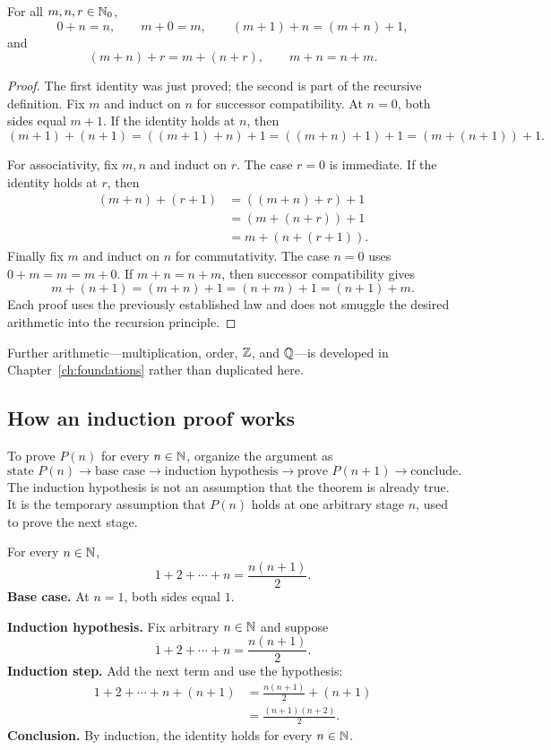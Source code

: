 \begin{proposition}
For all $m,n,r\in\mathbb{N}_0$,
\[
0+n=n,
\qquad
m+0=m,
\qquad
(m+1)+n=(m+n)+1,
\]
and
\[
(m+n)+r=m+(n+r),
\qquad
m+n=n+m.
\]
\end{proposition}
\begin{proof}
The first identity was just proved; the second is part of the recursive
definition. Fix $m$ and induct on $n$ for successor compatibility. At
$n=0$, both sides equal $m+1$. If the identity holds at $n$, then
\[
(m+1)+(n+1)=((m+1)+n)+1=((m+n)+1)+1=(m+(n+1))+1.
\]

For associativity, fix $m,n$ and induct on $r$. The case $r=0$ is
immediate. If the identity holds at $r$, then
\[
\begin{aligned}
(m+n)+(r+1)
&=((m+n)+r)+1\\
&=(m+(n+r))+1\\
&=m+(n+(r+1)).
\end{aligned}
\]
Finally fix $m$ and induct on $n$ for commutativity. The case $n=0$
uses $0+m=m=m+0$. If $m+n=n+m$, then successor compatibility gives
\[
m+(n+1)=(m+n)+1=(n+m)+1=(n+1)+m.
\]
Each proof uses the previously established law and does not smuggle the
desired arithmetic into the recursion principle.
\end{proof}

Further arithmetic---multiplication, order, \(\mathbb{Z}\), and \(\mathbb{Q}\)---is
developed in Chapter~\ref{ch:foundations} rather than duplicated here.

\subsection*{How an induction proof works}
To prove \(P(n)\) for every \(n\in\mathbb{N}\), organize the argument as
\[
\boxed{\text{state }P(n)\to\text{base case}\to\text{induction hypothesis}
\to\text{prove }P(n+1)\to\text{conclude}.}
\]
The induction hypothesis is not an assumption that the theorem is already
true. It is the temporary assumption that \(P(n)\) holds at one arbitrary
stage \(n\), used to prove the next stage.

\begin{example}
For every \(n\in\mathbb{N}\),
\[
1+2+\cdots+n=\frac{n(n+1)}2.
\]
\textbf{Base case.} At \(n=1\), both sides equal \(1\).

\textbf{Induction hypothesis.} Fix arbitrary \(n\in\mathbb{N}\) and suppose
\[
1+2+\cdots+n=\frac{n(n+1)}2.
\]
\textbf{Induction step.} Add the next term and use the hypothesis:
\begin{align*}
1+2+\cdots+n+(n+1)
&=\frac{n(n+1)}2+(n+1)\\
&=\frac{(n+1)(n+2)}2.
\end{align*}
\textbf{Conclusion.} By induction, the identity holds for every
\(n\in\mathbb{N}\).
\end{example}

